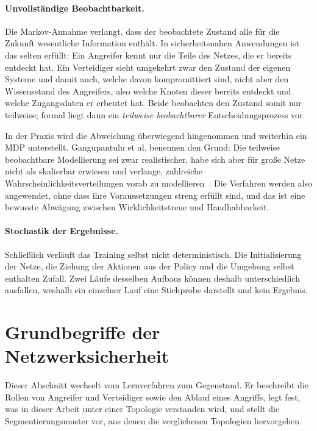 \paragraph{Unvollständige Beobachtbarkeit.}
Die Markov-Annahme verlangt, dass der beobachtete Zustand alle für die Zukunft
wesentliche Information enthält. In sicherheitsnahen Anwendungen ist das selten
erfüllt: Ein Angreifer kennt nur die Teile des Netzes, die er bereits entdeckt
hat. Ein Verteidiger sieht umgekehrt zwar den Zustand der eigenen Systeme und
damit auch, welche davon kompromittiert sind, nicht aber den Wissensstand des
Angreifers, also welche Knoten dieser bereits entdeckt und welche Zugangsdaten
er erbeutet hat. Beide beobachten den Zustand somit nur teilweise; formal liegt
dann ein \emph{teilweise beobachtbarer} Entscheidungsprozess vor.

In der Praxis wird die Abweichung überwiegend hingenommen und weiterhin ein
\ac{MDP} unterstellt. Gangupantulu et al. benennen den Grund: Die teilweise
beobachtbare Modellierung sei zwar realistischer, habe sich aber für große
Netze nicht als skalierbar erwiesen und verlange, zahlreiche
Wahrscheinlichkeitsverteilungen vorab zu
modellieren~\cite[Abschn.~II.C]{gangupantulu2021cja}. Die Verfahren werden also
angewendet, ohne dass ihre Voraussetzungen streng erfüllt sind, und das ist
eine bewusste Abwägung zwischen Wirklichkeitstreue und Handhabbarkeit.

\paragraph{Stochastik der Ergebnisse.}
Schließlich verläuft das Training selbst nicht deterministisch. Die
Initialisierung der Netze, die Ziehung der Aktionen aus der Policy und die
Umgebung selbst enthalten Zufall. Zwei Läufe desselben Aufbaus können deshalb
unterschiedlich ausfallen, weshalb ein einzelner Lauf eine Stichprobe darstellt
und kein Ergebnis.

\section{Grundbegriffe der Netzwerksicherheit}
\label{sec:netzsicherheit}

Dieser Abschnitt wechselt vom Lernverfahren zum Gegenstand. Er beschreibt
die Rollen von Angreifer und Verteidiger sowie den Ablauf eines Angriffs,
legt fest, was in dieser Arbeit unter einer Topologie verstanden wird, und
stellt die Segmentierungsmuster vor, aus denen die verglichenen Topologien
hervorgehen.

